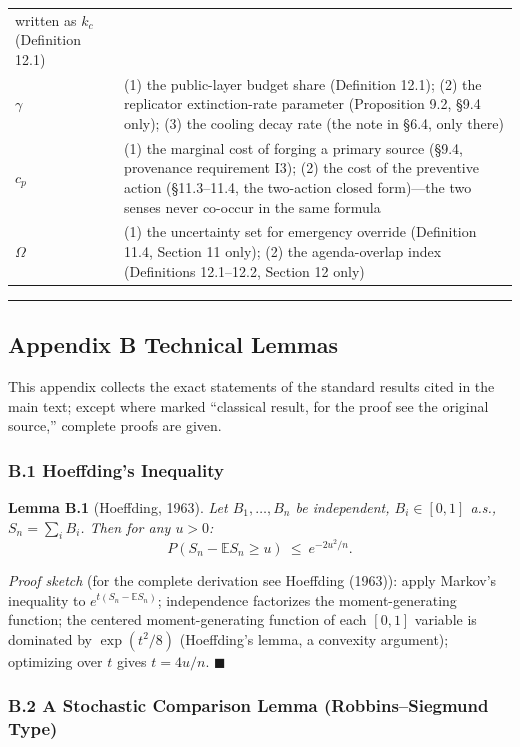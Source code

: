 \documentclass[
  11pt]{article}
\begin{document}
\begin{longtable}[]{@{}
  >{\raggedright\arraybackslash}p{}
  >{\raggedright\arraybackslash}p{}@{}}
written as \(k_c\) (Definition 12.1) \\
\(\gamma\) & (1) the public-layer budget share (Definition 12.1); (2)
the replicator extinction-rate parameter (Proposition 9.2, §9.4 only);
(3) the cooling decay rate (the note in §6.4, only there) \\
\(c_p\) & (1) the marginal cost of forging a primary source (§9.4,
provenance requirement I3); (2) the cost of the preventive action
(§11.3--11.4, the two-action closed form)---the two senses never
co-occur in the same formula \\
\(\Omega\) & (1) the uncertainty set for emergency override (Definition
11.4, Section 11 only); (2) the agenda-overlap index (Definitions
12.1--12.2, Section 12 only) \\
\end{longtable}

\begin{center}\rule{0.5\linewidth}{0.5pt}\end{center}

\subsection{Appendix B Technical
Lemmas}\label{appendix-b-technical-lemmas}

This appendix collects the exact statements of the standard results
cited in the main text; except where marked ``classical result, for the
proof see the original source,'' complete proofs are given.

\subsubsection{B.1 Hoeffding's
Inequality}\label{b.1-hoeffdings-inequality}

\textbf{Lemma B.1} (Hoeffding, 1963). \emph{Let \(B_1,\dots,B_n\) be
independent, \(B_i \in [0,1]\) a.s., \(S_n = \sum_i B_i\). Then for any
\(u > 0\):} \[P(S_n - \mathbb{E}S_n \ge u) \ \le\ e^{-2u^2/n}.\]

\emph{Proof sketch} (for the complete derivation see Hoeffding (1963)):
apply Markov's inequality to \(e^{t(S_n - \mathbb{E}S_n)}\);
independence factorizes the moment-generating function; the centered
moment-generating function of each \([0,1]\) variable is dominated by
\(\exp(t^2/8)\) (Hoeffding's lemma, a convexity argument); optimizing
over \(t\) gives \(t = 4u/n\). \(\blacksquare\)

\subsubsection{B.2 A Stochastic Comparison Lemma (Robbins--Siegmund
Type)}\label{b.2-a-stochastic-comparison-lemma-robbinssiegmund-type}
\end{document}
